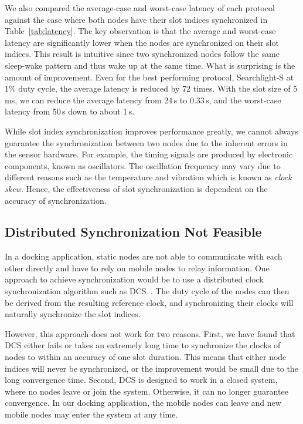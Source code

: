 \documentclass[twoside,twocolumn]{article}
\begin{document}
We also compared the average-case and worst-case latency of each
protocol against the case where both nodes have their slot indices
synchronized in Table~\ref{tab:latency}.  The key observation is that
the average and worst-case latency are significantly lower when the
nodes are synchronized on their slot indices. This result is intuitive
since two synchronized nodes follow the same sleep-wake pattern and
thus wake up at the same time.  What is surprising is the amount of
improvement. Even for the best performing protocol, Searchlight-S at
1\% duty cycle, the average latency is reduced by 72 times.  With the
slot size of 5\,ms, we can reduce the average latency from 24\,s to
0.33\,s, and the worst-case latency from 50\,s down to about 1\,s.

While slot index synchronization improves performance greatly, we
cannot always guarantee the synchronization between two nodes due to
the inherent errors in the sensor hardware. For example, the timing
signals are produced by electronic components, known as oscillators.
The oscillation frequency may vary due to different reasons such as
the temperature and vibration which is known as \emph{clock skew}.
Hence, the effectiveness of slot synchronization is dependent on the 
accuracy of synchronization.


\subsection{Distributed Synchronization Not Feasible}

In a docking application, static nodes are not able to communicate
with each other directly and have to rely on mobile nodes to relay
information. One approach to achieve synchronization would be to use a
distributed clock synchronization algorithm such as DCS~\citep{choi2012dcs}.  
The duty cycle of the nodes can then be derived from the resulting 
reference clock, and synchronizing their clocks will naturally 
synchronize the slot indices.

However, this approach does not work for two reasons. First, we have
found that DCS either fails or takes an extremely long time to
synchronize the clocks of nodes to within an accuracy of one slot
duration.  This means that either node indices will never be
synchronized, or the improvement would be small due to the long
convergence time.  Second, DCS is designed to work in a closed system,
where no nodes leave or join the system. Otherwise, it can no longer
guarantee convergence.  In our docking application, the mobile nodes
can leave and new mobile nodes may enter the system at any time.
\end{document}
